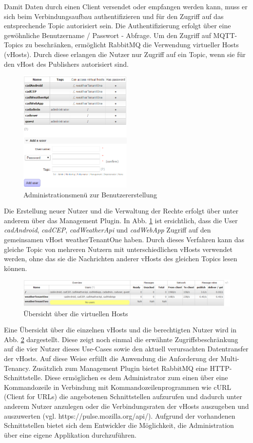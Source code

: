 Damit Daten durch einen Client versendet oder empfangen werden kann, muss er sich beim Verbindungsaufbau authentifizieren und für den Zugriff auf das entsprechende Topic autorisiert sein. Die Authentifizierung erfolgt über eine gewöhnliche Benutzername / Passwort - Abfrage. Um den Zugriff auf MQTT-Topics zu beschränken, ermöglicht RabbitMQ die Verwendung virtueller Hosts (vHosts). Durch diese erlangen die Nutzer nur Zugriff auf ein Topic, wenn sie für den vHost des Publishers autorisiert sind. 
\begin{figure}[htbp]
	\centering
	\includegraphics[width=0.5\textwidth]{Bilder/createUser.png}
	\caption{Administrationsmenü zur Benutzererstellung }
	\label{img:AdminCreateUser}
\end{figure}
Die Erstellung neuer Nutzer und die Verwaltung der Rechte erfolgt über unter anderem über das Management Plugin. In Abb. \ref{img:AdminCreateUser} ist ersichtlich, dass die User \textit{cadAndroid}, \textit{cadCEP}, \textit{cadWeatherApi} und \textit{cadWebApp} Zugriff auf den gemeinsamen vHost weatherTenantOne haben. Durch dieses Verfahren kann das gleiche Topic von mehreren Nutzern mit unterschiedlichen vHosts verwendet werden, ohne das sie die Nachrichten anderer vHosts des gleichen Topics lesen können. 
\begin{figure}[htbp]
	\centering
	\includegraphics[width=1.0\textwidth]{Bilder/vHostsOverview.png}
	\caption{Übersicht über die virtuellen Hosts}
	\label{img:vHostOverview}
\end{figure}
Eine Übersicht über die einzelnen vHosts und die berechtigten Nutzer wird in Abb. \ref{img:vHostOverview} dargestellt. Diese zeigt noch einmal die erwähnte Zugriffsbeschränkung auf die vier Nutzer dieses Use-Cases sowie den aktuell verursachten Datentransfer der vHosts. Auf diese Weise erfüllt die Anwendung die Anforderung der Multi-Tenancy. Zusätzlich zum Management Plugin bietet RabbitMQ eine HTTP-Schnittstelle. Diese ermöglichen es dem Administrator zum einen über eine Kommandozeile in Verbindung mit Kommandozeilenprogrammen wie cURL (Client for URLs) die angebotenen Schnittstellen aufzurufen und dadurch unter anderem Nutzer anzulegen oder die Verbindungsraten der vHosts auszugeben und auszuwerten (vgl. https://pulse.mozilla.org/api/). Aufgrund der vorhandenen Schnittstellen bietet sich dem Entwickler die Möglichkeit, die Administration über eine eigene Applikation durchzuführen. 
